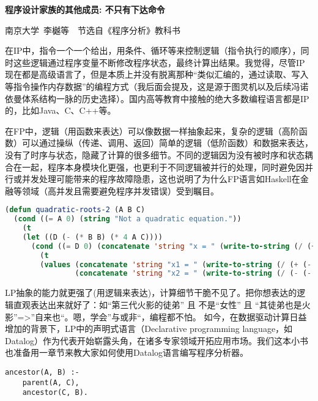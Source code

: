 \begin{pas}
	\begin{center}
		\large \textbf{程序设计家族的其他成员: 不只有下达命令}
		
	\end{center}
	\begin{center}
		南京大学~李樾等~~节选自《程序分析》教科书
	\end{center}
	在IP中，指令一个一个给出，用条件、循环等来控制逻辑（指令执行的顺序），同时这些逻辑通过程序变量不断修改程序状态，最终计算出结果。我觉得，尽管IP现在都是高级语言了，但是本质上并没有脱离那种“类似汇编的，通过读取、写入等指令操作内存数据”的编程方式（我后面会提及，这是源于图灵机以及后续冯诺依曼体系结构一脉的历史选择）。国内高等教育中接触的绝大多数编程语言都是IP的，比如Java、C、C++等。
	
在FP中，逻辑（用函数来表达）可以像数据一样抽象起来，复杂的逻辑（高阶函数）可以通过操纵（传递、调用、返回）简单的逻辑（低阶函数）和数据来表达，没有了时序与状态，隐藏了计算的很多细节。不同的逻辑因为没有被时序和状态耦合在一起，程序本身模块化更强，也更利于不同逻辑被并行的处理，同时避免因并行或并发处理可能带来的程序故障隐患，这也说明了为什么FP语言如Haskell在金融等领域（高并发且需要避免程序并发错误）受到瞩目。

\begin{lstlisting}[language=lisp]
	(defun quadratic-roots-2 (A B C)
  (cond ((= A 0) (string "Not a quadratic equation."))
    (t
    (let ((D (- (* B B) (* 4 A C))))
      (cond ((= D 0) (concatenate 'string "x = " (write-to-string (/ (+ (- B) (sqrt D)) (* 2 A)))))
        (t
        (values (concatenate 'string "x1 = " (write-to-string (/ (+ (- B) (sqrt D)) (* 2 A))))
                (concatenate 'string "x2 = " (write-to-string (/ (- (- B) (sqrt D)) (* 2 A)))))))))))
\end{lstlisting}

LP抽象的能力就更强了(用逻辑来表达)，计算细节干脆不见了。把你想表达的逻辑直观表达出来就好了：如“第三代火影的徒弟” 且 不是“女性” 且 “其徒弟也是火影”=>”自来也“。嗯，学会”与或非“，编程都不怕。 如今，在数据驱动计算日益增加的背景下，LP中的声明式语言（Declarative programming language，如Datalog）作为代表开始崭露头角，在诸多专家领域开拓应用市场。我们这本小书也准备用一章节来教大家如何使用Datalog语言编写程序分析器。
	\begin{lstlisting}
ancestor(A, B) :-
    parent(A, C),
    ancestor(C, B).
	\end{lstlisting}
\end{pas}



